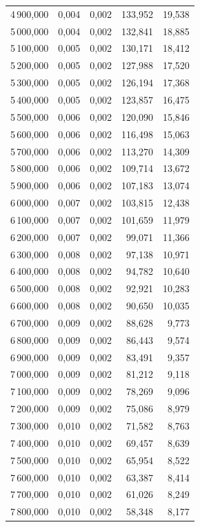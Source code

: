 \begin{longtable}{rrrrr}
4\,900,000 & 0,004 & 0,002 & 133,952 & 19,538\\
5\,000,000 & 0,004 & 0,002 & 132,841 & 18,885\\
5\,100,000 & 0,005 & 0,002 & 130,171 & 18,412\\
5\,200,000 & 0,005 & 0,002 & 127,988 & 17,520\\
5\,300,000 & 0,005 & 0,002 & 126,194 & 17,368\\
5\,400,000 & 0,005 & 0,002 & 123,857 & 16,475\\
5\,500,000 & 0,006 & 0,002 & 120,090 & 15,846\\
5\,600,000 & 0,006 & 0,002 & 116,498 & 15,063\\
5\,700,000 & 0,006 & 0,002 & 113,270 & 14,309\\
5\,800,000 & 0,006 & 0,002 & 109,714 & 13,672\\
5\,900,000 & 0,006 & 0,002 & 107,183 & 13,074\\
6\,000,000 & 0,007 & 0,002 & 103,815 & 12,438\\
6\,100,000 & 0,007 & 0,002 & 101,659 & 11,979\\
6\,200,000 & 0,007 & 0,002 & 99,071 & 11,366\\
6\,300,000 & 0,008 & 0,002 & 97,138 & 10,971\\
6\,400,000 & 0,008 & 0,002 & 94,782 & 10,640\\
6\,500,000 & 0,008 & 0,002 & 92,921 & 10,283\\
6\,600,000 & 0,008 & 0,002 & 90,650 & 10,035\\
6\,700,000 & 0,009 & 0,002 & 88,628 & 9,773\\
6\,800,000 & 0,009 & 0,002 & 86,443 & 9,574\\
6\,900,000 & 0,009 & 0,002 & 83,491 & 9,357\\
7\,000,000 & 0,009 & 0,002 & 81,212 & 9,118\\
7\,100,000 & 0,009 & 0,002 & 78,269 & 9,096\\
7\,200,000 & 0,009 & 0,002 & 75,086 & 8,979\\
7\,300,000 & 0,010 & 0,002 & 71,582 & 8,763\\
7\,400,000 & 0,010 & 0,002 & 69,457 & 8,639\\
7\,500,000 & 0,010 & 0,002 & 65,954 & 8,522\\
7\,600,000 & 0,010 & 0,002 & 63,387 & 8,414\\
7\,700,000 & 0,010 & 0,002 & 61,026 & 8,249\\
7\,800,000 & 0,010 & 0,002 & 58,348 & 8,177\\

\end{longtable}
